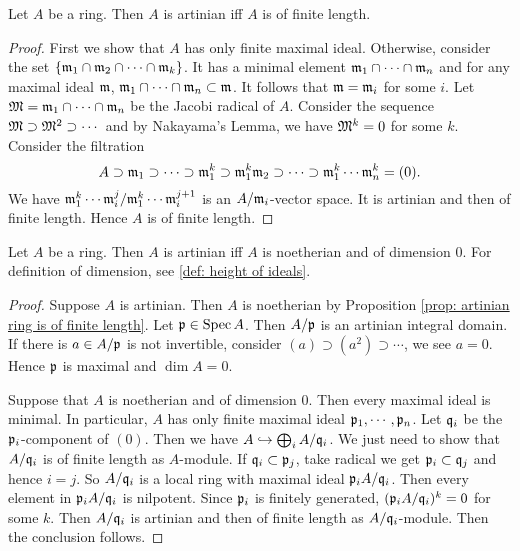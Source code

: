     \begin{proposition}\label{prop: artinian ring is of finite length}
        Let $A$ be a ring. 
        Then $A$ is artinian iff $A$ is of finite length.
    \end{proposition}
    \begin{proof}
        First we show that $A$ has only finite maximal ideal.
        Otherwise, consider the set $\{{\mathfrak{m}}_1 \cap {\mathfrak{m}}_2 \cap \cdots \cap {\mathfrak{m}}_k\}$.
        It has a minimal element ${\mathfrak{m}}_1 \cap \cdots \cap {\mathfrak{m}}_n$ and for any maximal ideal ${\mathfrak{m}}$, ${\mathfrak{m}}_1 \cap \cdots \cap {\mathfrak{m}}_n \subset {\mathfrak{m}}$.
        It follows that ${\mathfrak{m}} = {\mathfrak{m}}_i$ for some $i$.
        Let ${\mathfrak{M}} = {\mathfrak{m}}_1 \cap \cdots \cap {\mathfrak{m}}_n$ be the Jacobi radical of $A$.
        Consider the sequence ${\mathfrak{M}} \supset {\mathfrak{M}}^2 \supset \cdots$ and by Nakayama's Lemma, we have ${\mathfrak{M}}^k = 0$ for some $k$.
        Consider the filtration 
        \[ A \supset {\mathfrak{m}}_1 \supset \cdots \supset {\mathfrak{m}}_1^k \supset {\mathfrak{m}}_1^k{\mathfrak{m}}_2 \supset \cdots \supset {\mathfrak{m}}_1^k \cdots {\mathfrak{m}}_n^k  = (0). \] 
        We have ${\mathfrak{m}}_1^k\cdots{\mathfrak{m}}_i^j/{\mathfrak{m}}_1^k\cdots{\mathfrak{m}}_i^{j+1}$ is an $A/{\mathfrak{m}}_i$-vector space.
        It is artinian and then of finite length.
        Hence $A$ is of finite length.
    \end{proof}
    
    \begin{proposition}\label{prop: artinian ring is of codimension 0}
        Let $A$ be a ring. 
        Then $A$ is artinian iff $A$ is noetherian and of dimension $0$.
        For definition of dimension, see \ref{def: height of ideals}.
    \end{proposition}
    \begin{proof}
        Suppose $A$ is artinian.
        Then $A$ is noetherian by Proposition \ref{prop: artinian ring is of finite length}.
        Let ${\mathfrak{p}} \in \operatorname{Spec} A$.
        Then $A/{\mathfrak{p}}$ is an artinian integral domain.
        If there is $a\in A/{\mathfrak{p}}$ is not invertible, consider $(a) \supset (a^2) \supset \cdots$, we see $a=0$.
        Hence ${\mathfrak{p}}$ is maximal and $\dim A = 0$. 

        Suppose that $A$ is noetherian and of dimension $0$.
        Then every maximal ideal is minimal.
        In particular, $A$ has only finite maximal ideal ${\mathfrak{p}}_1,\cdots,{\mathfrak{p}}_n$.
        Let ${\mathfrak{q}}_i$ be the ${\mathfrak{p}}_i$-component of $(0)$.
        Then we have $A \hookrightarrow \bigoplus_i A/{\mathfrak{q}}_i$.
        We just need to show that $A/{\mathfrak{q}}_i$ is of finite length as $A$-module.
        If ${\mathfrak{q}}_i \subset {\mathfrak{p}}_j$, take radical we get ${\mathfrak{p}}_i \subset {\mathfrak{q}}_j$ and hence $i=j$.
        So $A/{\mathfrak{q}}_i$ is a local ring with maximal ideal ${\mathfrak{p}}_i A/{\mathfrak{q}}_i$.
        Then every element in ${\mathfrak{p}}_i A/{\mathfrak{q}}_i$ is nilpotent.
        Since ${\mathfrak{p}}_i$ is finitely generated, $({\mathfrak{p}}_i A/{\mathfrak{q}}_i)^k = 0$ for some $k$.
        Then $A/{\mathfrak{q}}_i$ is artinian and then of finite length as $A/{\mathfrak{q}}_i$-module.
        Then the conclusion follows.
    \end{proof}


